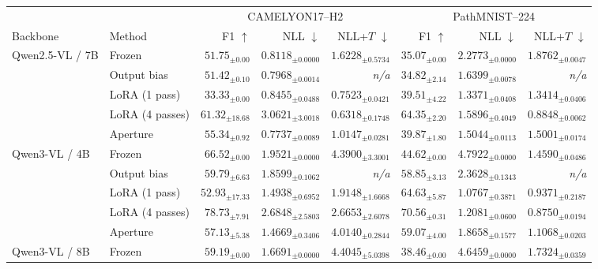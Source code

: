 \begin{tabular}{@{}llrrrrrr@{}}\toprule
& & \multicolumn{3}{c}{CAMELYON17--H2} & \multicolumn{3}{c}{PathMNIST--224} \\
\cmidrule(lr){3-5}\cmidrule(lr){6-8}
Backbone & Method & F1 $\uparrow$ & NLL $\downarrow$ & NLL+$T$ $\downarrow$ & F1 $\uparrow$ & NLL $\downarrow$ & NLL+$T$ $\downarrow$ \\
\midrule
Qwen2.5-VL / 7B & Frozen & $51.75_{\pm 0.00}$ & $0.8118_{\pm 0.0000}$ & $1.6228_{\pm 0.5734}$ & $35.07_{\pm 0.00}$ & $2.2773_{\pm 0.0000}$ & $1.8762_{\pm 0.0047}$ \\
 & Output bias & $51.42_{\pm 0.10}$ & $0.7968_{\pm 0.0014}$ & \textit{n/a} & $34.82_{\pm 2.14}$ & $1.6399_{\pm 0.0078}$ & \textit{n/a} \\
 & LoRA (1 pass) & $33.33_{\pm 0.00}$ & $0.8455_{\pm 0.0488}$ & $0.7523_{\pm 0.0421}$ & $39.51_{\pm 4.22}$ & $\mathbf{1.3371}_{\pm 0.0408}$ & $1.3414_{\pm 0.0406}$ \\
 & LoRA (4 passes) & $\mathbf{61.32}_{\pm 18.68}$ & $3.0621_{\pm 3.0018}$ & $\mathbf{0.6318}_{\pm 0.1748}$ & $\mathbf{64.35}_{\pm 2.20}$ & $1.5896_{\pm 0.4049}$ & $\mathbf{0.8848}_{\pm 0.0062}$ \\
 & Aperture & $55.34_{\pm 0.92}$ & $\mathbf{0.7737}_{\pm 0.0089}$ & $1.0147_{\pm 0.0281}$ & $39.87_{\pm 1.80}$ & $1.5044_{\pm 0.0113}$ & $1.5001_{\pm 0.0174}$ \\
\midrule
Qwen3-VL / 4B & Frozen & $66.52_{\pm 0.00}$ & $1.9521_{\pm 0.0000}$ & $4.3900_{\pm 3.3001}$ & $44.62_{\pm 0.00}$ & $4.7922_{\pm 0.0000}$ & $1.4590_{\pm 0.0486}$ \\
 & Output bias & $59.79_{\pm 6.63}$ & $1.8599_{\pm 0.1062}$ & \textit{n/a} & $58.85_{\pm 3.13}$ & $2.3628_{\pm 0.1343}$ & \textit{n/a} \\
 & LoRA (1 pass) & $52.93_{\pm 17.33}$ & $1.4938_{\pm 0.6952}$ & $\mathbf{1.9148}_{\pm 1.6668}$ & $64.63_{\pm 5.87}$ & $\mathbf{1.0767}_{\pm 0.3871}$ & $0.9371_{\pm 0.2187}$ \\
 & LoRA (4 passes) & $\mathbf{78.73}_{\pm 7.91}$ & $2.6848_{\pm 2.5803}$ & $2.6653_{\pm 2.6078}$ & $\mathbf{70.56}_{\pm 0.31}$ & $1.2081_{\pm 0.0600}$ & $\mathbf{0.8750}_{\pm 0.0194}$ \\
 & Aperture & $57.13_{\pm 5.38}$ & $\mathbf{1.4669}_{\pm 0.3406}$ & $4.0140_{\pm 0.2844}$ & $59.07_{\pm 4.00}$ & $1.8658_{\pm 0.1577}$ & $1.1068_{\pm 0.0203}$ \\
\midrule
Qwen3-VL / 8B & Frozen & $59.19_{\pm 0.00}$ & $1.6691_{\pm 0.0000}$ & $4.4045_{\pm 5.0398}$ & $38.46_{\pm 0.00}$ & $4.6459_{\pm 0.0000}$ & $1.7324_{\pm 0.0359}$ \\

\end{tabular}

